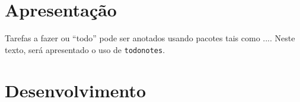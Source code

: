 \documentclass{article}
\begin{document}
\listoftodos %
\section{Apresentação}
Tarefas a fazer ou ``todo'' pode ser anotados usando pacotes tais como .... Neste texto, será apresentado o uso de \texttt{todonotes}.
\section{Desenvolvimento}
\end{document}
